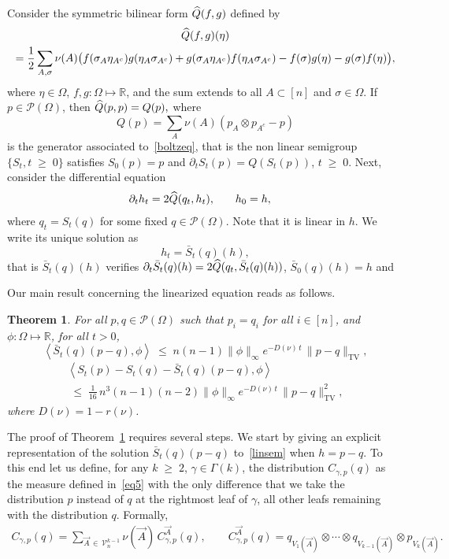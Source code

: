 \documentclass[10pt,a4paper]{article}
\newtheorem{theo}[theorem]{Theorem}
\renewcommand{\leq}{\;\leqslant\;}
\renewcommand{\geq}{\;\geqslant\;}
\newcommand{\Om}{\Omega}
\newcommand{\si}{\sigma}
\newcommand{\tv}{\mathrm{TV}}
\newcommand{\cP}{\mathcal{P}}
\newcommand{\cV}{\mathcal{V}}
\newcommand{\bbR}{\mathbb{R}}
\let\g=\gamma
\let\G=\Gamma
\let\O=\Omega
\let\oldhat\hat
\renewcommand*{\hat}[1]{\mathchoice{\widehat{#1}}{\widehat{#1}}{\oldhat{#1}}{\oldhat{#1}}}
\begin{document}
Consider the symmetric bilinear form $\hat{Q}(f,g)$ defined by
\begin{multline}
 \hat{Q}(f,g)(\eta)\\
=
\frac{1}{2}\sum_{A,\si}
\nu(A)\big(f(\sigma_{A} \eta_{A^c}) g(\eta_{A}\sigma_{A^c}) + g(\sigma_{A} \eta_{A^c})f(\eta_{A}\sigma_{A^c}) - f(\sigma)g(\eta)- g(\sigma)f(\eta)\big),
\end{multline}
where $\eta \in \Om$, $f,g:\O\mapsto\bbR$, and the sum extends to all $A \subset [n]$ and $\si \in \O$.
If $p \in \cP(\O)$, then $\hat{Q}(p,p) = Q(p),$ where
\[
Q(p)=\sum_A\nu(A)(p_A\otimes p_{A^c} - p)
\]
is the generator associated to~\eqref{boltzeq}, that is the non linear semigroup $\{S_t, t \geq 0\}$ satisfies $S_0 (p)= p$ and $\partial_t S_t (p)= Q (S_t (p))$, $t\geq 0$.
Next, consider the differential equation
\begin{align}\label{linsem}
&\partial_t h_t = 2\hat{Q}(q_t,h_t), \ \ \ \;\;\; h_0=h,
\end{align}
where $q_t = S_t(q)$ for some fixed $ q \in \cP(\O)$. Note that it is linear in $h$.
We write its unique solution as
\[
h_t=\bar{S}_t(q)(h),
\]
that is $\bar{S}_t(q)(h)$ verifies $\partial_t \bar{S}_t(q)(h) = 2\hat{Q}(q_t,\bar{S}_t(q)(h))$, $\bar{S}_0(q)(h)=h$ and

Our main result concerning the linearized equation reads as follows.

\begin{theo}\label{wasscontrlemma2}
For all $p,q \in \cP(\O)$ such that $p_{i} = q_{i}$ for all $i \in [n]$, and $\phi:\O\mapsto\bbR$, for all $t>0$,
\begin{equation}\label{nonlincont2}
\left\langle \bar{S}_t(q)(p-q),\phi\right\rangle  \leq n(n-1)\|\phi\|_{\infty}e^{-D(\nu) \,t}\,\|p-q\|_\tv,
\end{equation}
\begin{multline}\label{nonlincont3}
\left\langle S_t(p)-S_t(q)-\bar{S}_t(q)(p-q),\phi\right\rangle \\
\leq \frac1{16}\,n^3(n-1)(n-2) \|\phi\|_{\infty}e^{-D(\nu) \,t}\,\|p-q\|_\tv^2, 
\end{multline}
where $D(\nu)= 1-r(\nu)$.
\end{theo}

The proof of Theorem~\ref{wasscontrlemma2} requires several steps. We start by giving an explicit representation of the solution $\bar{S}_t(q)(p-q)$ to~\eqref{linsem} when $h=p-q$. To this end let us define, for any $k\geq 2$, $\g\in\G(k)$, the distribution $C_{\gamma, p}(q)$ as the measure defined in~\eqref{eq5} with the only difference that we take the distribution $p$ instead of $q$ at the rightmost leaf of $\g$, all other leafs remaining with the distribution $q$. Formally,
\begin{align}\label{eqab5}
C_{\gamma,p}(q)= \sum_{\vec A\,\in\,\cV_n^{k-1}}\nu(\vec A) \,C^{\vec A}_{\gamma,p}(q),\qquad C^{\vec A}_{\gamma,p}(q) = q_{V_1(\vec A)}\otimes\cdots\otimes q_{V_{k-1}(\vec A)}\otimes p_{V_{k}(\vec A)}.
\end{align}
\end{document}
